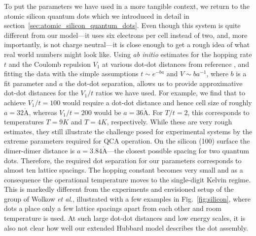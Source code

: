 To put the parameters we have used in a more tangible context, we return to the
atomic silicon quantum dots which we introduced in detail in
section~\ref{sec:atomic_silicon_quantum_dots}. Even though this system is quite
different from our model---it uses six electrons per cell instead of two, and,
more importantly, is not charge neutral---it is close enough to get a rough idea
of what real world numbers might look like. Using \emph{ab initio} estimates for
the hopping rate $t$ and the Coulomb repulsion $V_1$ at various dot-dot
distances from reference \cite{Pitters2011Tunnel}, and fitting the data with the
simple assumptions $t \sim e^{-b a}$ and $V \sim b a^{-1}$, where $b$ is a fit
parameter and $a$ the dot-dot separation, allows us to provide approximative
dot-dot distances for the $V_1/t$ ratios we have used. For example, we find
that to achieve $V_1/t = 100$ would require a dot-dot distance and hence cell
size of roughly $a = 32 \mathring{\mathrm{A}}$, whereas $V_1/t = 200$ would be
$a = 36 \mathring{\mathrm{A}}$. For $T/t = 2$, this corresponds to temperatures
$T = 9K$ and $T = 4K$, respectively. While these are very rough estimates, they
still illustrate the challenge posed for experimental systems by the extreme
parameters required for QCA operation. On the silicon (100) surface the
dimer-dimer distance is $a = 3.84 \mathring{\mathrm{A}}$---the closest possible
spacing for two quantum dots. Therefore, the required dot separation for our
parameters corresponds to almost ten lattice spacings. The hopping constant
becomes very small and as a consequence the operational temperature moves to the
single-digit Kelvin regime. This is markedly different from the experiments and
envisioned setup of the group of Wolkow \emph{et al}., illustrated with a few
examples in Fig.~\ref{fig:silicon}, where dots a place only a few lattice
spacings apart from each other and room temperature is used. At such large
dot-dot distances and low energy scales, it is also not clear how well our
extended Hubbard model describes the dot assembly.


%



